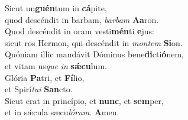 \evenverse Sicut un\textbf{guén}tum in \textbf{cá}pite,~\*\\
\evenverse quod descéndit in barbam, \textit{bar}\textit{bam} \textbf{A}\textbf{a}ron.\\
\oddverse Quod descéndit in oram vesti\textbf{mén}ti \textbf{e}jus:~\*\\
\oddverse sicut ros Hermon, qui descéndit in \textit{mon}\textit{tem} \textbf{Si}on.\\
\evenverse Quóniam illic mandávit Dóminus bene\textbf{di}cti\textbf{ó}nem,~\*\\
\evenverse et vitam us\textit{que} \textit{in} \textbf{sǽ}\textbf{cu}lum.\\
\oddverse Glória \textbf{Pa}tri, et \textbf{Fí}lio,~\*\\
\oddverse et Spirí\textit{tu}\textit{i} \textbf{San}cto.\\
\evenverse Sicut erat in princípio, et \textbf{nunc}, et \textbf{sem}per,~\*\\
\evenverse et in sǽcula sæcu\textit{ló}\textit{rum}. \textbf{A}men.\\

